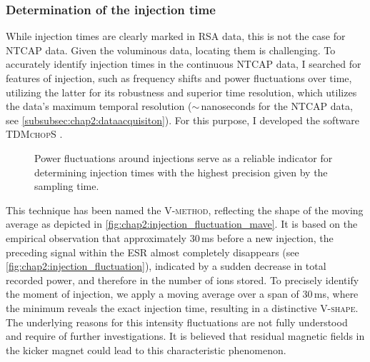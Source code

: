 \subsubsection{Determination of the injection time}\label{subsubsec:chap2:injectiontime}
While injection times are clearly marked in \textsc{RSA} data, this is not the case for \textsc{NTCAP} data. Given the voluminous data, locating them is challenging. To accurately identify injection times in the continuous \textsc{NTCAP} data, I searched for features of injection, such as frequency shifts and power fluctuations over time, utilizing the latter for its robustness and superior time resolution, which utilizes the data's maximum temporal resolution ($\sim$\,nanoseconds for the \textsc{NTCAP} data, see \cref{subsubsec:chap2:dataacquisiton}). For this purpose, I developed the software \textsc{TDMchopS} \cite{freire_fernandez_2023_8172227}.
\newpar
\begin{figure}[hbt]
    \centering
    \vspace{0.1cm}
    \caption{Power fluctuations around injections serve as a reliable indicator for determining injection times with the highest precision given by the sampling time.}
    \label{fig:chap2:injection_fluctuations}
\end{figure}

This technique has been named the \textsc{V-method}, reflecting the shape of the moving average as depicted in \cref{fig:chap2:injection_fluctuation_mave}. It is based on the empirical observation that approximately $30$\,ms before a new injection, the preceding signal within the \textsc{ESR} almost completely disappears (see \cref{fig:chap2:injection_fluctuation}), indicated by a sudden decrease in total recorded power, and therefore in the number of ions stored. To precisely identify the moment of injection, we apply a moving average over a span of $30$\,ms, where the minimum reveals the exact injection time, resulting in a distinctive \textsc{V-shape}.
\newpar
The underlying reasons for this intensity fluctuations are not fully understood and require of further investigations. It is believed that residual magnetic fields in the kicker magnet could lead to this characteristic phenomenon.

